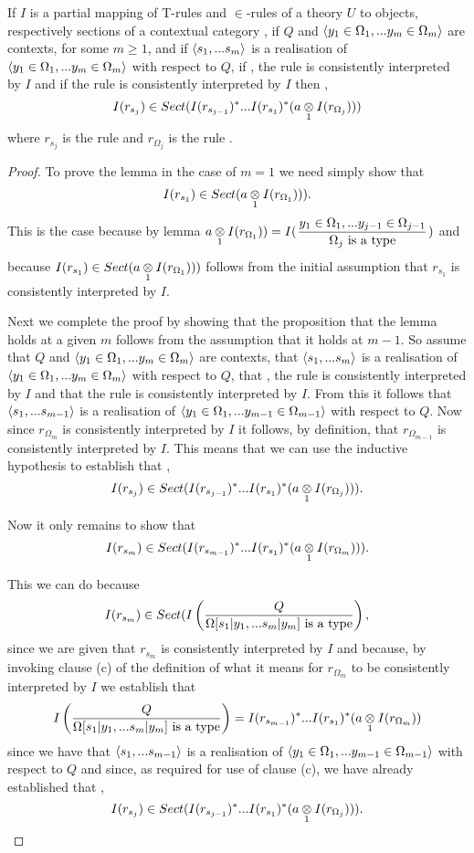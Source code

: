 \newpage

\begin{lemma}
\newcommand {\forceSOURCEwidth}{\rule{5cm}{0pt}}  %
\newcommand {\forceTARGETwidth}{\rule{2.2cm}{0pt}}
If $I$ is a partial mapping of T-rules and $\in$-rules of a theory $U$ to objects, respectively sections of a contextual category \catcw,
 if $Q$  and $\encyOmega{m}$ are contexts, for some $m \geq 1$,  and if $\tuple{\sm}$ is a realisation of $\tuple{\yOmega{m}}$ with respect to $Q$,
 if \foreachj, the rule  is consistently interpreted by $I$ and if the rule  is consistently interpreted by $I$
then \foreachj, 
 $$I(r_{s_j}) \in Sect(I(r_{s_{j-1}})^*...I(r_{s_1})^*(\crossx{a}{I(r_{\Omega_j})}{1}))$$
 where $r_{s_j}$ is the rule  and $r_{\Omega_j}$ is the rule .
\end{lemma}
\begin{proof}
To prove the lemma in the case of $m=1$ we need simply show that 
 $$I(r_{s_1}) \in Sect(\crossx{a}{I(r_{\Omega_1})}{1})).$$
 This is the case because by lemma  $\crossx{a}{I(r_{\Omega_1})}{1}) = I(\IOmega{j})$
 and because $I(r_{s_1}) \in Sect(\crossx{a}{I(r_{\Omega_1})}{1}))$ follows from the initial assumption that $r_{s_1}$ is
 consistently interpreted by $I$. 

Next we complete the proof by showing that the proposition that the lemma holds at a given $m$ follows from
the assumption that it holds at $m-1$. So assume that $Q$  and $\encyOmega{m}$ are contexts, 
that $\tuple{\sm}$ is a realisation of $\tuple{\yOmega{m}}$ with respect to $Q$,
that \foreachj, the rule  is consistently interpreted by $I$ 
and that the rule  is consistently interpreted by $I$. From this it follows
that  $\tuple{\sm[-1]}$ is a realisation of $\tuple{\yOmega{m-1}}$ with respect to $Q$.
Now since $r_{\Omega_m}$ is consistently interpreted by $I$ it follows, by definition,  that $r_{\Omega_{m-1}}$ is consistently interpreted by $I$. This means that we can use the inductive hypothesis to establish that \foreachj[m-1],  
$$I(r_{s_j}) \in Sect(I(r_{s_{j-1}})^*...I(r_{s_1})^*(\crossx{a}{I(r_{\Omega_j})}{1})).$$

Now it only remains to show that
$$I(r_{s_m}) \in Sect(I(r_{s_{m-1}})^*...I(r_{s_1})^*(\crossx{a}{I(r_{\Omega_m})}{1})).$$

This we can do because
$$I(r_{s_m}) \in Sect(\Imappedrule{Q}{\isT{\Omega[\SUBsFORy{m}]}},$$ since we are given that $r_{s_m}$ is consistently interpreted by $I$
and because, by invoking clause (c) of the definition of what it means for $r_{\Omega_m}$ to be consistently interpreted by $I$
we establish that
 $$\Imappedrule{Q}{\isT{\Omega[\SUBsFORy{m}]}}= I(r_{s_{m-1}})^*...I(r_{s_1})^*(\crossx{a}{I(r_{\Omega_m})}{1})$$
 since we have that $\tuple{\sm[-1]}$ is a realisation of $\tuple{\yOmega{m-1}}$ with respect to $Q$
 and since, as required for use of clause (c), we have already established that \foreachj[m-1],  
$$I(r_{s_j}) \in Sect(I(r_{s_{j-1}})^*...I(r_{s_1})^*(\crossx{a}{I(r_{\Omega_j})}{1})).$$
 \end{proof}
\newpage

